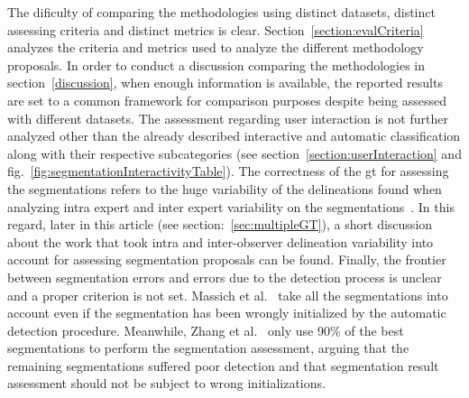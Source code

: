 \documentclass[authoryear,preprint,review,12pt]{elsarticle}
\begin{document}
The dificulty of comparing the methodologies using distinct datasets, distinct assessing criteria and distinct metrics is clear. 
Section~\ref{section:evalCriteria} analyzes the criteria and metrics used to analyze the different methodology proposals. In order to conduct a discussion comparing the methodologies in section~\ref{discussion}, when enough information is available, the reported results are set to a common framework for comparison purposes despite being assessed with different datasets.
The assessment regarding user interaction is not further analyzed other than the already described interactive and automatic classification along with their respective subcategories (see section~\ref{section:userInteraction} and fig.~\ref{fig:segmentationInteractivityTable}). 
The correctness of the \ac{gt} for assessing the segmentations refers to the huge variability of the delineations found when analyzing intra expert and inter expert variability on the segmentations~\cite{gerard2013}. In this regard, later in this article (see section:~\ref{sec:multipleGT}), a short discussion about the work that took intra and inter-observer delineation variability into account for assessing segmentation proposals can be found. 
Finally, the frontier between segmentation errors and errors due to the detection process is unclear and a proper criterion is not set. Massich et al.~\cite{massich2010lesion} take all the segmentations into account even if the segmentation has been wrongly initialized by the automatic detection procedure. Meanwhile, Zhang et al.~\cite{Zhang:2010p14317} only use 90\% of the best segmentations to perform the segmentation assessment, arguing that the remaining segmentations suffered poor detection and that segmentation result assessment should not be subject to wrong initializations.

\end{document}
